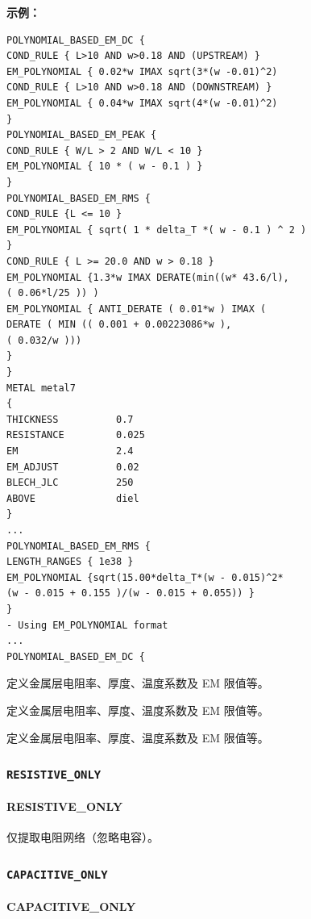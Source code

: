 \textbf{示例：}
\begin{lstlisting}
POLYNOMIAL_BASED_EM_DC {
COND_RULE { L>10 AND w>0.18 AND (UPSTREAM) }
EM_POLYNOMIAL { 0.02*w IMAX sqrt(3*(w -0.01)^2)
COND_RULE { L>10 AND w>0.18 AND (DOWNSTREAM) }
EM_POLYNOMIAL { 0.04*w IMAX sqrt(4*(w -0.01)^2)
}
POLYNOMIAL_BASED_EM_PEAK {
COND_RULE { W/L > 2 AND W/L < 10 }
EM_POLYNOMIAL { 10 * ( w - 0.1 ) }
}
POLYNOMIAL_BASED_EM_RMS {
COND_RULE {L <= 10 }
EM_POLYNOMIAL { sqrt( 1 * delta_T *( w - 0.1 ) ^ 2 )
}
COND_RULE { L >= 20.0 AND w > 0.18 }
EM_POLYNOMIAL {1.3*w IMAX DERATE(min((w* 43.6/l),
( 0.06*l/25 )) )
EM_POLYNOMIAL { ANTI_DERATE ( 0.01*w ) IMAX (
DERATE ( MIN (( 0.001 + 0.00223086*w ),
( 0.032/w )))
}
}
METAL metal7
{
THICKNESS          0.7
RESISTANCE         0.025
EM                 2.4
EM_ADJUST          0.02
BLECH_JLC          250
ABOVE              diel
}
...
POLYNOMIAL_BASED_EM_RMS {
LENGTH_RANGES { 1e38 }
EM_POLYNOMIAL {sqrt(15.00*delta_T*(w - 0.015)^2*
(w - 0.015 + 0.155 )/(w - 0.015 + 0.055)) }
}
- Using EM_POLYNOMIAL format
...
POLYNOMIAL_BASED_EM_DC {
\end{lstlisting}

\begin{noteBox}
定义金属层电阻率、厚度、温度系数及 EM 限值等。
\end{noteBox}

\begin{noteBox}
定义金属层电阻率、厚度、温度系数及 EM 限值等。
\end{noteBox}

\begin{noteBox}
定义金属层电阻率、厚度、温度系数及 EM 限值等。
\end{noteBox}

\subsubsection{\texttt{RESISTIVE_ONLY}}
\paragraph*{RESISTIVE_ONLY}

仅提取电阻网络（忽略电容）。

\subsubsection{\texttt{CAPACITIVE_ONLY}}
\paragraph*{CAPACITIVE_ONLY}

